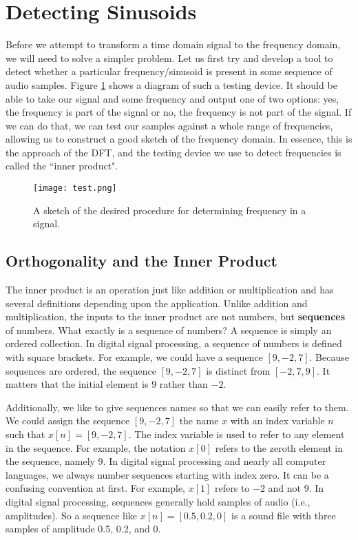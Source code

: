 \section*{Detecting Sinusoids}

Before we attempt to transform a time domain signal to the frequency domain, we will need to solve
a simpler problem.  Let us first try and develop a tool to detect whether a particular frequency/sinusoid 
is present in some sequence of audio samples. Figure 
\ref{fig:test} shows a diagram of such a testing device.  It should be able to take our signal and some frequency
and output one of two options: yes, the frequency is part of the signal or no, the frequency is not part of the signal.
If we can do that, we can test our samples against
a whole range of frequencies, allowing us to construct a good sketch of the frequency domain.   In essence,
 this is the approach of the DFT, and the testing device we use to detect frequencies is called the ``inner product".
 
 \begin{figure}[h]
 	\caption{A sketch of the desired procedure for determining frequency in a signal.}
 	\centering
 	\texttt{[image: test.png]}
 	\label{fig:test}
 \end{figure}

\subsection*{Orthogonality and the Inner Product}

The inner product is an operation just like addition or multiplication and has several definitions depending
upon the application.  Unlike addition and multiplication, the inputs to the inner product are not numbers, but \textbf{sequences} of numbers.
What exactly is a sequence of numbers?  A sequence
is simply an ordered collection.  In digital signal 
processing, a sequence of numbers is defined with square brackets.  For example, we could have a sequence
$[9, -2, 7]$.  Because sequences are ordered, the sequence $[9, -2, 7]$ is distinct from $[-2, 7, 9]$.  It matters
that the initial element is $9$ rather than $-2$.  

Additionally, we like to give sequences names so that we can easily refer to them.  
We could assign the sequence $[9, -2, 7]$ the name $x$ with an index variable $n$ such that 
$x[n] = [9, -2, 7]$.  The index variable is used to refer to any element in the sequence.  For example,
the notation $x[0]$ refers to the zeroth element in the sequence, namely 9.  In digital signal processing
and nearly all computer languages, we always number sequences starting with index zero.  It can
be a confusing convention at first.  For example, $x[1]$ refers to $-2$ and not $9$.  In digital signal processing,
sequences generally hold samples of audio (i.e., amplitudes).  So a sequence like $x[n] = [0.5, 0.2, 0]$ is a sound file with three samples of amplitude 0.5, 0.2, and 0.

